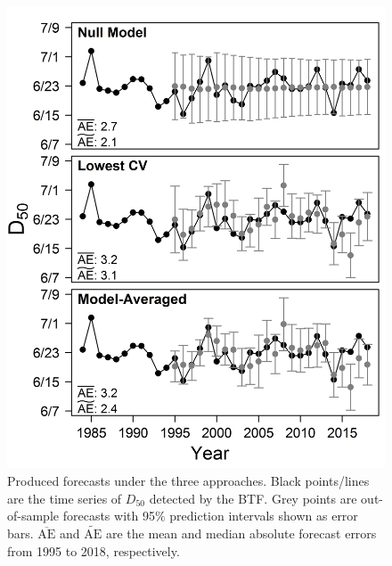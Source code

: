 \documentclass[12pt,]{book}
\theoremstyle{definition}
\theoremstyle{definition}
\theoremstyle{definition}
\theoremstyle{remark}
\begin{document}
\begin{figure}
  \centering
  \includegraphics{img/Ch2/forecasts.png}
  \caption{Produced forecasts under the three approaches. Black points/lines are the time series of $D_{50}$ detected by the BTF. Grey points are out-of-sample forecasts with 95$\%$ prediction intervals shown as error bars. $\overline{\text{AE}}$ and $\widetilde{\text{AE}}$ are the mean and median absolute forecast errors from 1995 to 2018, respectively.}
  \label{fig:forecasts}
\end{figure}

\clearpage
\end{document}

